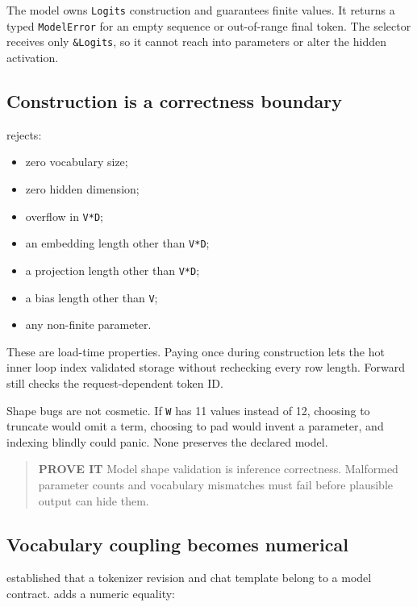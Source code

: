 The model owns \texttt{Logits} construction and guarantees finite
values. It returns a typed \texttt{ModelError} for an empty sequence or
out-of-range final token. The selector receives only \texttt{\&Logits},
so it cannot reach into parameters or alter the hidden activation.

\subsection{Construction is a correctness
boundary}\label{construction-is-a-correctness-boundary}

\texttt{} rejects:

\begin{itemize}
\tightlist
\item
  zero vocabulary size;
\item
  zero hidden dimension;
\item
  overflow in \texttt{V*D};
\item
  an embedding length other than \texttt{V*D};
\item
  a projection length other than \texttt{V*D};
\item
  a bias length other than \texttt{V};
\item
  any non-finite parameter.
\end{itemize}

These are load-time properties. Paying once during construction lets the
hot inner loop index validated storage without rechecking every row
length. Forward still checks the request-dependent token ID.

Shape bugs are not cosmetic. If \texttt{W} has 11 values instead of 12,
choosing to truncate would omit a term, choosing to pad would invent a
parameter, and indexing blindly could panic. None preserves the declared
model.

\begin{quote}
\textbf{PROVE IT} Model shape validation is inference correctness.
Malformed parameter counts and vocabulary mismatches must fail before
plausible output can hide them.
\end{quote}

\subsection{Vocabulary coupling becomes
numerical}\label{vocabulary-coupling-becomes-numerical}

 established that a tokenizer revision and chat template belong
to a model contract.  adds a numeric equality:

